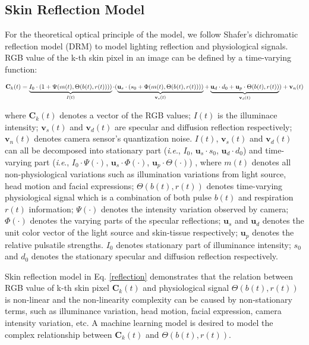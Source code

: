 \documentclass[conference]{IEEEtran}
\newcommand{\ie}{\textit{i}.\textit{e}.}
\begin{document}
\subsection{Skin Reflection Model}
For the theoretical optical principle of the model, we follow Shafer's dichromatic reflection model (DRM) \cite{wang2016algorithmic} to model lighting reflection and physiological signals. RGB value of the k-th skin pixel in an image can be defined by a time-varying function\cite{chen2018deepphys, liu2020multi}:

\begin{dmath}
\textbf{C}_{k}(t) = \underbrace{I_{0}\cdot(1+\Psi(m(t), \Theta(b(t), r(t))))}_{I(t)} \cdot (\underbrace{\mathbf{u}_{s}\cdot(s_{0} + \Phi(m(t), \Theta(b(t), r(t))))}_{\mathbf{v}_{s}(t)} + \underbrace{\mathbf{u}_{d}\cdot d_{0} + \mathbf{u}_{p}\cdot \Theta(b(t), r(t))}_{\mathbf{v}_{d}(t)}) + \mathbf{v}_{n}(t) \\
\label{reflection}
\end{dmath}

where $\textbf{C}_k(t)$ denotes a vector of the RGB values; $I(t)$ is the illuminace intensity; $\mathbf{v}_{s}(t)$ and $\mathbf{v}_{d}(t)$ are specular and diffusion reflection respectively; $\mathbf{v}_{n}(t)$ denotes camera sensor's quantization noise. $I(t)$, $\mathbf{v}_{s}(t)$ and $\mathbf{v}_{d}(t)$ can all be decomposed into stationary part (\ie, $I_{0}$, $\mathbf{u}_{s}\cdot s_{0}$, $\mathbf{u}_{d} \cdot d_{0}$) and time-varying part (\ie, $I_{0}\cdot\Psi(\cdot)$, $\mathbf{u}_{s}\cdot\Phi(\cdot)$, $\mathbf{u}_{p}\cdot \Theta(\cdot) $) \cite{wang2016algorithmic}, where $m(t)$ denotes all non-physiological variations such as illumination variations from light source, head motion and facial expressions; $\Theta(b(t), r(t))$ denotes time-varying physiological signal which is a combination of both pulse $b(t)$ and respiration $r(t)$ information; $\Psi (\cdot)$ denotes the intensity variation observed by camera; $\Phi(\cdot)$ denotes the varying parts of the specular reflections;  $\mathbf{u}_{s}$ and $\mathbf{u}_{d}$ denotes the unit color vector of the light source and skin-tissue respectively; $\mathbf{u}_{p}$ denotes the relative pulsatile strengths. $I_{0}$ denotes stationary part of illuminance intensity; $s_{0}$ and $d_{0}$ denotes the stationary specular and diffusion reflection respectively.

Skin reflection model in Eq. \ref{reflection} demonstrates that the relation between RGB value of k-th skin pixel $\textbf{C}_{k}(t)$ and physiological signal $\Theta(b(t), r(t))$ is non-linear and the non-linearity complexity can be caused by non-stationary terms, such as illuminance variation, head motion, facial expression, camera intensity variation, etc. A machine learning model is desired to model the complex relationship between $\textbf{C}_{k}(t)$ and $\Theta(b(t), r(t))$.
\end{document}
